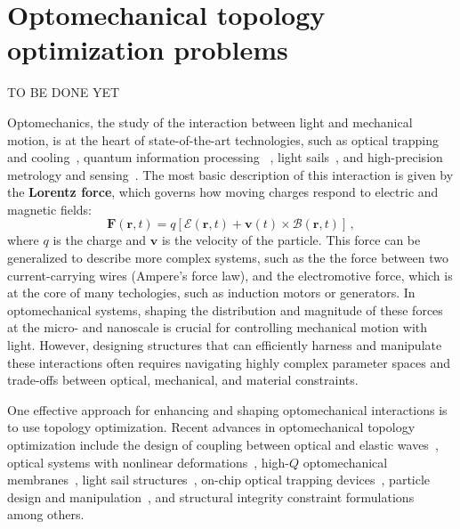 \chapter{Optomechanical topology optimization problems}\label{chap:om}
TO BE DONE YET

Optomechanics, the study of the interaction between light and mechanical motion, is at the heart of state-of-the-art technologies, such as 
optical trapping~\cite{ashkin_acceleration_1970, moffitt_recent_2008} and cooling~\cite{cooling}, quantum information processing~\cite{Andrews_2014, Xi_2025}
, light sails~\cite{lightsail, lightsail1}, and high-precision metrology and sensing~\cite{sensing, weakforce, Li:18, Mason_2019}. The most basic description of this interaction is given by the \textbf{Lorentz force}, which governs how moving charges respond to electric and magnetic fields:
\begin{equation}\label{eq:lorentz_f}
    \mathbf{\mathbf{F}}(\mathbf{r},t) = q \left[ \bm{\mathcal{E}}(\mathbf{r},t) + \mathbf{v}(t) \times \bm{\mathcal{B}}(\mathbf{r},t) \right]\,,
\end{equation}
where $q$ is the charge and $\mathbf{v}$ is the velocity of the particle. This force can be generalized to describe more complex systems,
such as the the force between two current-carrying 
wires (Ampere's force law), and the electromotive force, which is at the core of many techologies, such as induction motors or generators.
In optomechanical systems, shaping the distribution and magnitude of these forces at the micro- and nanoscale is crucial for controlling mechanical motion with light. 
However, designing structures that can efficiently harness and manipulate these interactions often requires navigating highly complex
 parameter spaces and trade-offs between optical, mechanical, and material constraints.

 One effective approach for enhancing and shaping optomechanical interactions is to use topology optimization.
Recent advances in optomechanical topology optimization include the design of coupling between optical and elastic
 waves~\cite{photo_topopt}, optical systems with nonlinear deformations~\cite{def_wg}, high-$Q$ optomechanical membranes~\cite{highQ1, fengwen, aragon1},
light sail structures~\cite{lightsail_topopt, lightsail_topopt1},
on-chip optical trapping devices~\cite{ownpub1}, particle design and manipulation~\cite{ownpub2, particle_opt},
and structural integrity constraint formulations~\cite{structural_integrity}
 among others.

